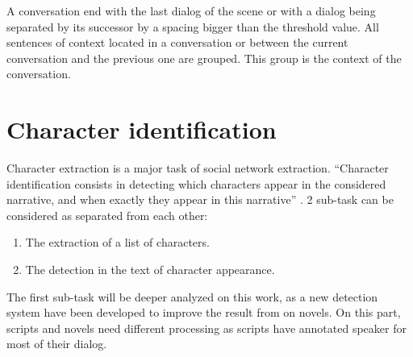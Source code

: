 \documentclass[a4paper, 12pt]{report}
\begin{document}
A conversation end with the last dialog of the scene or with a dialog being separated by its successor by a spacing bigger than the threshold value. All sentences of context located in a conversation or between the current conversation and the previous one are grouped. This group is the context of the conversation.\\



\section{Character identification}
Character extraction is a major task of social network extraction. ``Character identification consists in detecting which characters appear in the considered narrative, and when exactly they appear in this narrative'' \citep{fiction}. 2 sub-task can be considered as separated from each other:
\begin{enumerate}
\item The extraction of a list of characters.
\item The detection in the text of character appearance.
\end{enumerate}

The first sub-task will be deeper analyzed on this work, as a new detection system have been developed to improve the result from \cite{original} on novels. On this part, scripts and novels need different processing as scripts have annotated speaker for most of their dialog.  
\end{document}
